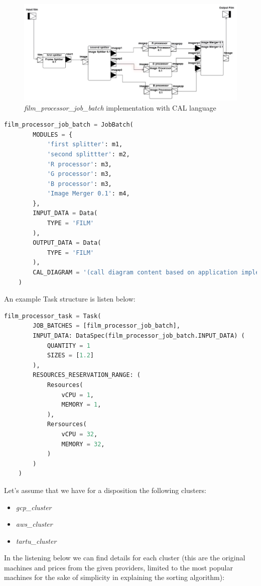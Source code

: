\documentclass{article}
\begin{document}
	\begin{figure}[h]
		\caption{\textit{film\_processor\_job\_batch} implementation with CAL language}
		\label{job_batch_example}
		\centering
		\includegraphics[width=1\textwidth]{example_app}
	\end{figure}
	
	\begin{lstlisting}[language=Python]
	film_processor_job_batch = JobBatch(
		MODULES = {
			'first splitter': m1,
			'second splittter': m2,
			'R processor': m3,
			'G processor': m3,
			'B processor': m3,
			'Image Merger 0.1': m4,
		},
		INPUT_DATA = Data(
			TYPE = 'FILM'
		),
		OUTPUT_DATA = Data(
			TYPE = 'FILM'
		),
		CAL_DIAGRAM = '(call diagram content based on application implementation)',
	)
	\end{lstlisting}
	
	An example Task structure is listen below:
	\begin{lstlisting}[language=Python]
	film_processor_task = Task(
		JOB_BATCHES = [film_processor_job_batch],
		INPUT_DATA: DataSpec(film_processor_job_batch.INPUT_DATA) (
			QUANTITY = 1
			SIZES = [1.2]
		),
		RESOURCES_RESERVATION_RANGE: (
			Resources(
				vCPU = 1,
				MEMORY = 1,
			), 
			Rersources(
				vCPU = 32,
				MEMORY = 32,
			)
		)
	)
	\end{lstlisting}
	
	Let's assume that we have for a disposition the following clusters:
	\begin{itemize}
		\item \textit{gcp\_cluster}\cite{gcp_cluster}
		\item \textit{aws\_cluster}\cite{aws_cluster}
		\item \textit{tartu\_cluster}\cite{tartu_cluster}
	\end{itemize}
	In the listening below we can find details for each cluster (this are the original machines and prices from the given providers, limited to the most popular machines for the sake of simplicity in explaining the sorting algorithm):
	
\end{document}
